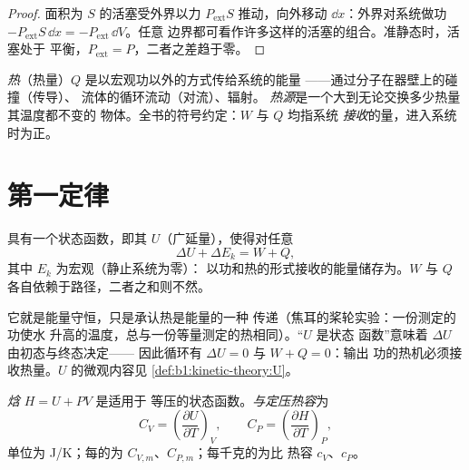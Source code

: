 \begin{proof}
面积为 $S$ 的活塞受外界以力
$P_{\mathrm{ext}}S$ 推动，向外移动 $\dd x$：外界对系统做功
$-P_{\mathrm{ext}}S\,\dd x = -P_{\mathrm{ext}}\,\dd V$。任意
边界都可看作许多这样的活塞的组合。准静态时，活塞处于
平衡，$P_{\mathrm{ext}} = P$，二者之差趋于零。
\end{proof}

\begin{definition}[热]\label{def:b1:first-law:heat}
\emph{热}（热量）$Q$ 是以宏观功以外的方式传给系统的能量
——通过分子在器壁上的碰撞（传导）、
流体的循环流动（对流）、辐射。
\emph{热源}是一个大到无论交换多少热量其温度都不变的
物体。全书的符号约定：$W$ 与 $Q$ 均指系统
\emph{接收}的量，进入系统时为正。
\end{definition}

\section{第一定律}

\begin{theorem}[热力学第一定律]\label{thm:b1:first-law:firstlaw}
具有一个状态函数，即其\emph{}
$U$（广延量），使得对任意
\[
\Delta U + \Delta E_{k} = W + Q ,
\]
其中 $E_k$ 为宏观（静止系统为零）：
以功和热的形式接收的能量储存为。$W$
与 $Q$ 各自依赖于路径，二者之和则不然。
\end{theorem}
\admitted

\begin{remark}[它说的是什么]\label{rem:b1:first-law:meaning}
它就是能量守恒，只是承认热是能量的一种
传递（焦耳的桨轮实验：一份测定的功使水
升高的温度，总与一份等量测定的热相同）。“$U$ 是状态
函数”意味着 $\Delta U$ 由初态与终态决定——
因此循环有 $\Delta U = 0$ 与 $W + Q = 0$：输出
功的热机必须接收热量。$U$ 的微观内容见
\cref{def:b1:kinetic-theory:U}。
\end{remark}

\begin{definition}[焓；热容]\label{def:b1:first-law:enthalpy}
\emph{焓} $H = U + PV$ 是适用于
等压的状态函数。\emph{与定压热容}为
\[
C_V = \left(\frac{\partial U}{\partial T}\right)_V, \qquad
C_P = \left(\frac{\partial H}{\partial T}\right)_P ,
\]
单位为 \unit{J/K}；每的为 $C_{V,m}$、$C_{P,m}$；每千克的为比
热容 $c_V$、$c_P$。
\end{definition}

